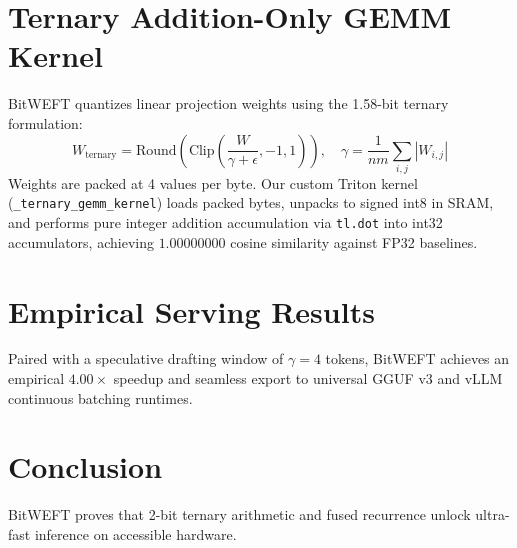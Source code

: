 \documentclass[11pt,a4paper]{article}
\begin{document}
\section{Ternary Addition-Only GEMM Kernel}
BitWEFT quantizes linear projection weights using the 1.58-bit ternary formulation:
\begin{equation}
W_{\text{ternary}} = \text{Round}\left(\text{Clip}\left(\frac{W}{\gamma + \epsilon}, -1, 1\right)\right), \quad \gamma = \frac{1}{nm}\sum_{i,j}|W_{i,j}|
\end{equation}
Weights are packed at 4 values per byte. Our custom Triton kernel (\texttt{\_ternary\_gemm\_kernel}) loads packed bytes, unpacks to signed int8 in SRAM, and performs pure integer addition accumulation via \texttt{tl.dot} into int32 accumulators, achieving $1.00000000$ cosine similarity against FP32 baselines.

\section{Empirical Serving Results}
Paired with a speculative drafting window of $\gamma=4$ tokens, BitWEFT achieves an empirical $4.00\times$ speedup and seamless export to universal GGUF v3 and vLLM continuous batching runtimes.

\section{Conclusion}
BitWEFT proves that 2-bit ternary arithmetic and fused recurrence unlock ultra-fast inference on accessible hardware.
\end{document}
